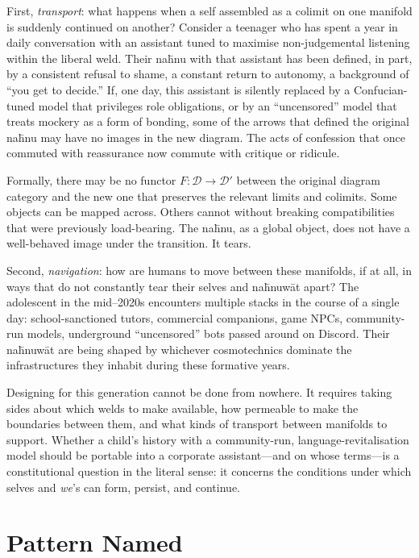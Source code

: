 First, \emph{transport}: what happens when a self assembled as a colimit on one manifold is suddenly continued on another? Consider a teenager who has spent a year in daily conversation with an assistant tuned to maximise non-judgemental listening within the liberal weld. Their na\={h}nu with that assistant has been defined, in part, by a consistent refusal to shame, a constant return to autonomy, a background of ``you get to decide.'' If, one day, this assistant is silently replaced by a Confucian-tuned model that privileges role obligations, or by an ``uncensored'' model that treats mockery as a form of bonding, some of the arrows that defined the original na\={h}nu may have no images in the new diagram. The acts of confession that once commuted with reassurance now commute with critique or ridicule.

Formally, there may be no functor $F \colon \mathcal{D} \to \mathcal{D}'$ between the original diagram category and the new one that preserves the relevant limits and colimits. Some objects can be mapped across. Others cannot without breaking compatibilities that were previously load-bearing. The na\={h}nu, as a global object, does not have a well-behaved image under the transition. It tears.

Second, \emph{navigation}: how are humans to move between these manifolds, if at all, in ways that do not constantly tear their selves and na\={h}nuw\={a}t apart? The adolescent in the mid--2020s encounters multiple stacks in the course of a single day: school-sanctioned tutors, commercial companions, game NPCs, community-run models, underground ``uncensored'' bots passed around on Discord. Their na\={h}nuw\={a}t are being shaped by whichever cosmotechnics dominate the infrastructures they inhabit during these formative years.

Designing for this generation cannot be done from nowhere. It requires taking sides about which welds to make available, how permeable to make the boundaries between them, and what kinds of transport between manifolds to support. Whether a child's history with a community-run, language-revitalisation model should be portable into a corporate assistant---and on whose terms---is a constitutional question in the literal sense: it concerns the conditions under which selves and \emph{we}'s can form, persist, and continue.

\section{Pattern Named}

